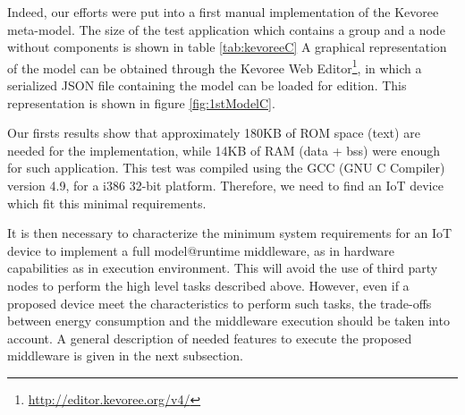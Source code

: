 Indeed, our efforts were put into a first manual implementation of the Kevoree meta-model.
The size of the test application which contains a group and a node without components is shown in table \ref{tab:kevoreeC}
A graphical representation of the model can be obtained through the Kevoree Web Editor\footnote{\url{http://editor.kevoree.org/v4/}}, in which a serialized JSON file containing the model can be loaded for edition.
This representation is shown in figure \ref{fig:1stModelC}.

Our firsts results show that approximately 180KB of ROM space (text) are needed for the implementation, while 14KB of RAM (data + bss) were enough for such application.
This test was compiled using the GCC (GNU C Compiler) version 4.9, for a i386 32-bit platform.
Therefore, we need to find an IoT device which fit this minimal requirements.

It is then necessary to characterize the minimum system requirements for an IoT device to implement a full model@runtime middleware, as in hardware capabilities as in execution environment.
This will avoid the use of third party nodes to perform the high level tasks described above.
However, even if a proposed device meet the characteristics to perform such tasks, the trade-offs between energy consumption and the middleware execution should be taken into account.
A general description of needed features to execute the proposed middleware is given in the next subsection.

